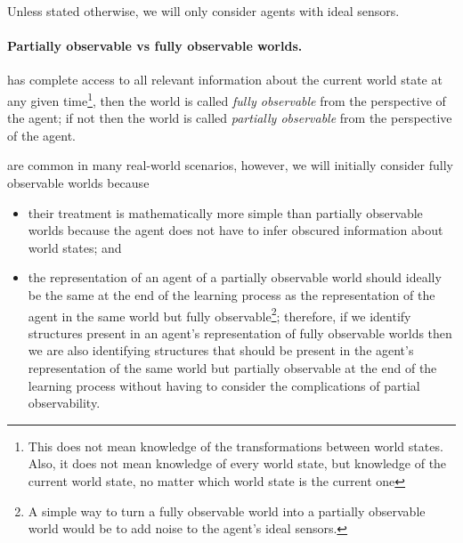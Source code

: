 Unless stated otherwise, we will only consider agents with ideal sensors.


\paragraph{Partially observable vs fully observable worlds.}

 has complete access to all relevant information about the current world state at any given time\footnote{
This does not mean knowledge of the transformations between world states.
Also, it does not mean knowledge of every world state, but knowledge of the current world state, no matter which world state is the current one
}, then the world is called \emph{fully observable} from the perspective of the agent; if not then the world is called \emph{partially observable} from the perspective of the agent.

 are common in many real-world scenarios, however, we will initially consider fully observable worlds because
\begin{itemize}
    \item their treatment is mathematically more simple than partially observable worlds because the agent does not have to infer obscured information about world states; and
    \item the representation of an agent of a partially observable world should ideally be the same at the end of the learning process as the representation of the agent in the same world but fully observable\footnote{
    A simple way to turn a fully observable world into a partially observable world would be to add noise to the agent's ideal sensors.
    }; therefore, if we identify structures present in an agent's representation of fully observable worlds then we are also identifying structures that should be present in the agent's representation of the same world but partially observable at the end of the learning process without having to consider the complications of partial observability.
\end{itemize}


